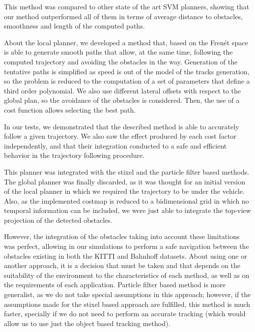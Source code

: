 This method was compared to other state of the art \ac{SVM} planners, showing that our method outperformed all of them in terms of average distance to obstacles, smoothness and length of the computed paths.

About the local planner, we developed a method that, based on the Frenét space is able to generate smooth paths that allow, at the same time, following the computed trajectory and avoiding the obstacles in the way. Generation of the tentative paths is simplified as speed is out of the model of the tracks generation, so the problem is reduced to the computation of a set of parameters that define a third order polynomial. We also use different lateral offsets with respect to the global plan, so the avoidance of the obstacles is considered. Then, the use of a cost function allows selecting the best path.

In our tests, we demonstrated that the described method is able to accurately follow a given trajectory. We also saw the effect produced by each cost factor independently, and that their integration conducted to a safe and efficient behavior in the trajectory following procedure.

This planner was integrated with the stixel and the particle filter based methods. The global planner was finally discarded, as it was thought for an initial version of the local planner in which we required the trajectory to be under the vehicle. Also, as the implemented costmap is reduced to a bidimensional grid in which no temporal information can be included, we were just able to integrate the top-view projection of the detected obstacles.

However, the integration of the obstacles taking into account these limitations was perfect, allowing in our simulations to perform a safe navigation between the obstacles existing in both the KITTI \citep{geiger2013vision} and Bahnhoff \citep{ess2009robust} datasets. About using one or another approach, it is a decision that must be taken and that depends on the suitability of the environment to the characteristics of each method, as well as on the requirements of each application. Particle filter based method is more generalist, as we do not take special assumptions in this approach; however, if the assumptions made for the stixel based approach are fulfilled, this method is much faster, specially if we do not need to perform an accurate tracking (which would allow us to use just the object based tracking method).


